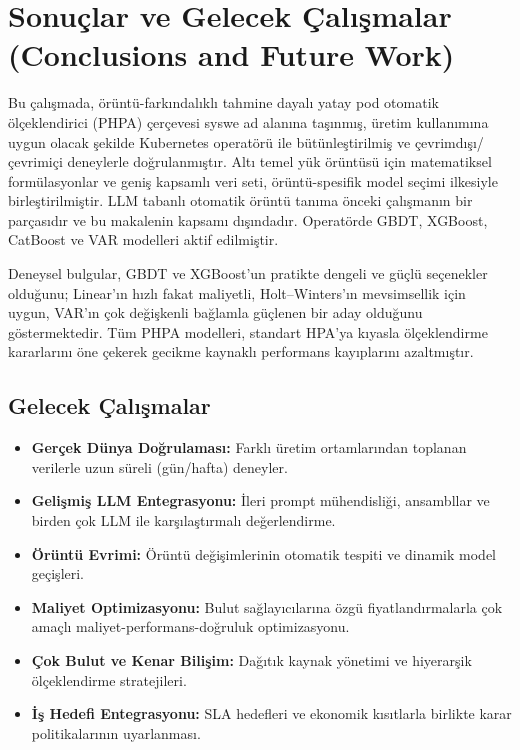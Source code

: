 \section{Sonuçlar ve Gelecek Çalışmalar (Conclusions and Future Work)}

Bu çalışmada, örüntü-farkındalıklı tahmine dayalı yatay pod otomatik ölçeklendirici (PHPA) çerçevesi syswe ad alanına taşınmış, üretim kullanımına uygun olacak şekilde Kubernetes operatörü ile bütünleştirilmiş ve çevrimdışı/çevrimiçi deneylerle doğrulanmıştır. Altı temel yük örüntüsü için matematiksel formülasyonlar ve geniş kapsamlı veri seti, örüntü-spesifik model seçimi ilkesiyle birleştirilmiştir. LLM tabanlı otomatik örüntü tanıma önceki çalışmanın bir parçasıdır ve bu makalenin kapsamı dışındadır. Operatörde GBDT, XGBoost, CatBoost ve VAR modelleri aktif edilmiştir.

Deneysel bulgular, GBDT ve XGBoost'un pratikte dengeli ve güçlü seçenekler olduğunu; Linear'ın hızlı fakat maliyetli, Holt–Winters'ın mevsimsellik için uygun, VAR'ın çok değişkenli bağlamla güçlenen bir aday olduğunu göstermektedir. Tüm PHPA modelleri, standart HPA'ya kıyasla ölçeklendirme kararlarını öne çekerek gecikme kaynaklı performans kayıplarını azaltmıştır.

\subsection{Gelecek Çalışmalar}

\begin{itemize}[noitemsep]
  \item \textbf{Gerçek Dünya Doğrulaması:} Farklı üretim ortamlarından toplanan verilerle uzun süreli (gün/hafta) deneyler.
  \item \textbf{Gelişmiş LLM Entegrasyonu:} İleri prompt mühendisliği, ansambllar ve birden çok LLM ile karşılaştırmalı değerlendirme.
  \item \textbf{Örüntü Evrimi:} Örüntü değişimlerinin otomatik tespiti ve dinamik model geçişleri.
  \item \textbf{Maliyet Optimizasyonu:} Bulut sağlayıcılarına özgü fiyatlandırmalarla çok amaçlı maliyet-performans-doğruluk optimizasyonu.
  \item \textbf{Çok Bulut ve Kenar Bilişim:} Dağıtık kaynak yönetimi ve hiyerarşik ölçeklendirme stratejileri.
  \item \textbf{İş Hedefi Entegrasyonu:} SLA hedefleri ve ekonomik kısıtlarla birlikte karar politikalarının uyarlanması.
\end{itemize}
